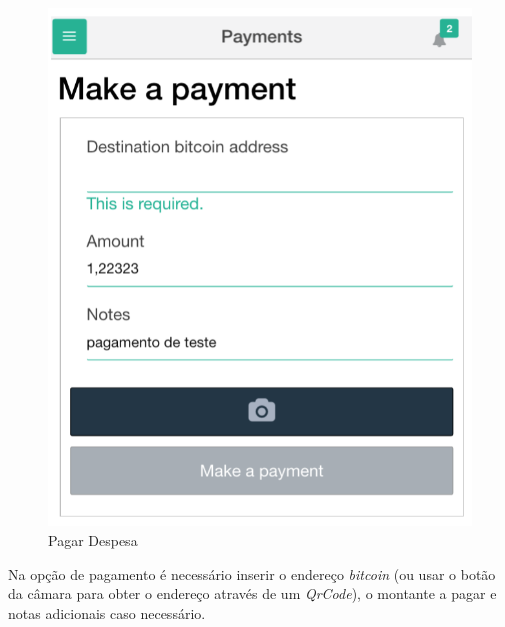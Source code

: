 \begin{figure}[H]
	\begin{center}
		\includegraphics[width=0.5
		\textwidth]{payments/pay.png}
	\end{center}
	\caption{Pagar Despesa}
	\label{fig:4_2}
\end{figure}

 Na opção de pagamento é necessário inserir o endereço \textit{bitcoin} (ou usar o botão da câmara para obter o endereço através de um \textit{QrCode}), o montante a pagar e notas adicionais caso necessário.